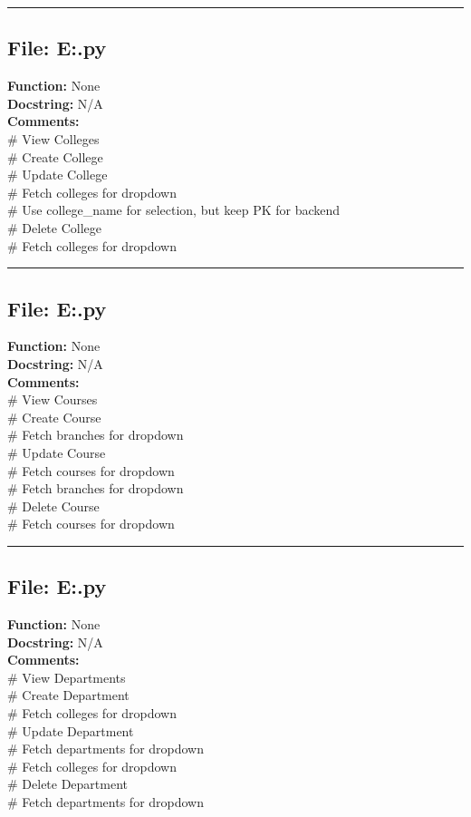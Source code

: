 {\hrule

\subsection*{File: E:\project\capstone\frontend\admin\college.py}
\textbf{Function:} None\\
\textbf{Docstring:} N/A\\
\textbf{Comments:}\\
# View Colleges\\
# Create College\\
# Update College\\
# Fetch colleges for dropdown\\
# Use college\_name for selection, but keep PK for backend\\
# Delete College\\
# Fetch colleges for dropdown\\

\hrule

\subsection*{File: E:\project\capstone\frontend\admin\course.py}
\textbf{Function:} None\\
\textbf{Docstring:} N/A\\
\textbf{Comments:}\\
# View Courses\\
# Create Course\\
# Fetch branches for dropdown\\
# Update Course\\
# Fetch courses for dropdown\\
# Fetch branches for dropdown\\
# Delete Course\\
# Fetch courses for dropdown\\

\hrule

\subsection*{File: E:\project\capstone\frontend\admin\department.py}
\textbf{Function:} None\\
\textbf{Docstring:} N/A\\
\textbf{Comments:}\\
# View Departments\\
# Create Department\\
# Fetch colleges for dropdown\\
# Update Department\\
# Fetch departments for dropdown\\
# Fetch colleges for dropdown\\
# Delete Department\\
# Fetch departments for dropdown\\

}

